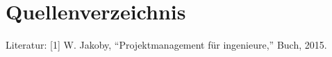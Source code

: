 \section{Quellenverzeichnis} \label{sec:anhang}
Literatur: 
[1] W. Jakoby, “Projektmanagement für ingenieure,” Buch, 2015.
